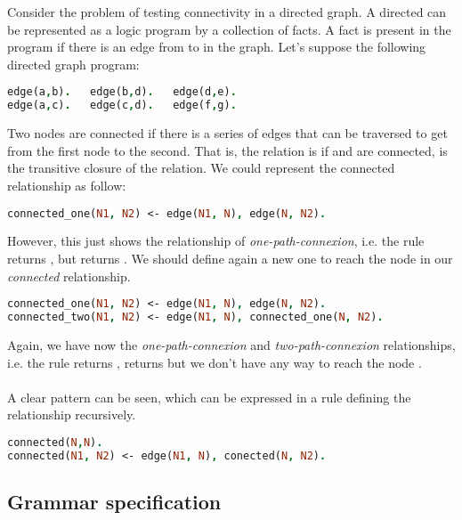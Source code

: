 Consider the problem of testing connectivity in a directed graph. A directed can be represented as a logic program by a collection of facts. A fact  is present in the program if there is an edge from  to  in the graph. Let's suppose the following directed graph program:
\begin{lstlisting}[language=Prolog, caption=A direct graph]
edge(a,b).   edge(b,d).   edge(d,e).
edge(a,c).   edge(c,d).   edge(f,g).
\end{lstlisting}
Two nodes are connected if there is a series of edges that can be traversed to get from the first node to the second. That is, the relation  is  if  and  are connected, is the transitive closure of the  relation. We could represent the connected relationship as follow:
\begin{lstlisting}[language=Prolog, caption=Connected relationship]
connected_one(N1, N2) <- edge(N1, N), edge(N, N2).
\end{lstlisting}
However, this just shows the relationship of \textit{one-path-connexion}, i.e. the rule \\  returns , but  returns . We should define again a new one to reach the node  in our \textit{connected} relationship.
\begin{lstlisting}[language=Prolog, caption=Connected relationship]
connected_one(N1, N2) <- edge(N1, N), edge(N, N2).
connected_two(N1, N2) <- edge(N1, N), connected_one(N, N2).
\end{lstlisting}
Again, we have now the \textit{one-path-connexion} and \textit{two-path-connexion} relationships, i.e. the rule  returns ,  returns  but we don't have any way to reach the node .\\\\
A clear pattern can be seen, which can be expressed in a rule defining the relationship  recursively.
\begin{lstlisting}[language=Prolog, caption=Generalization of the connected relationship]
connected(N,N).
connected(N1, N2) <- edge(N1, N), conected(N, N2).
\end{lstlisting}

\subsection{Grammar specification}

